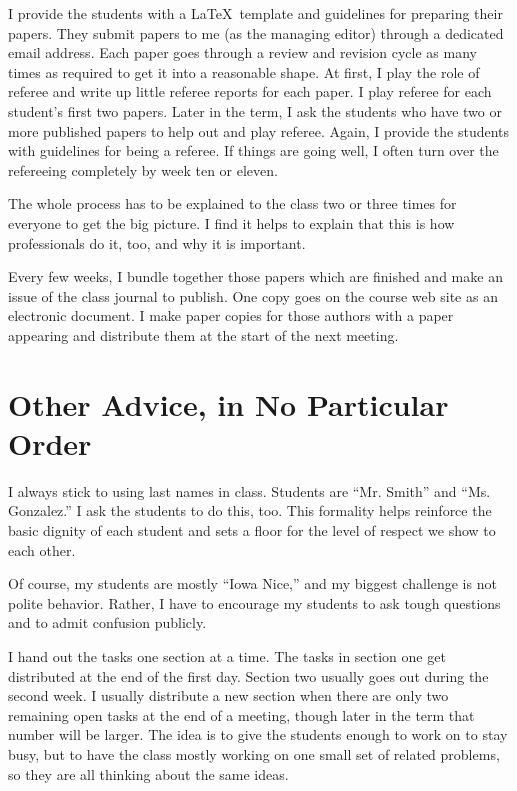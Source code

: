 \begin{annotation}
I provide the students with a \LaTeX\ template and guidelines for preparing their papers. They submit papers to me (as the managing editor) through a dedicated email address. Each paper goes through a review and revision cycle as many times as required to get it into a reasonable shape. At first, I play the role of referee and write up little referee reports for each paper. I play referee for each student's first two papers. Later in the term, I ask the students who have two or more published papers to help out and play referee. Again, I provide the students with guidelines for being a referee. If things are going well, I often turn over the refereeing completely by week ten or eleven. 

The whole process has to be explained to the class two or three times for everyone to get the big picture. I find it helps to explain that this is how professionals do it, too, and why it is important.

Every few weeks, I bundle together those papers which are finished and make an issue of the class journal to publish. One copy goes on the course web site as an electronic document. I make paper copies for those authors with a paper appearing and distribute them at the start of the next meeting.


\section*{Other Advice, in No Particular Order}

I always stick to using last names in class. Students are ``Mr. Smith'' and ``Ms. Gonzalez.'' I ask the students to do this, too. This formality helps reinforce the basic dignity of each student and sets a floor for the level of respect we show to each other.

Of course, my students are mostly ``Iowa Nice,'' and my biggest challenge is not polite behavior. Rather, I have to encourage my students to ask tough questions and to admit confusion publicly.

I hand out the tasks one section at a time. The tasks in section one get distributed at the end of the first day. Section two usually goes out during the second week. I usually distribute a new section when there are only two remaining open tasks at the end of a meeting, though later in the term that number will be larger. The idea is to give the students enough to work on to stay busy, but to have the class mostly working on one small set of related problems, so they are all thinking about the same ideas.


\end{annotation}
